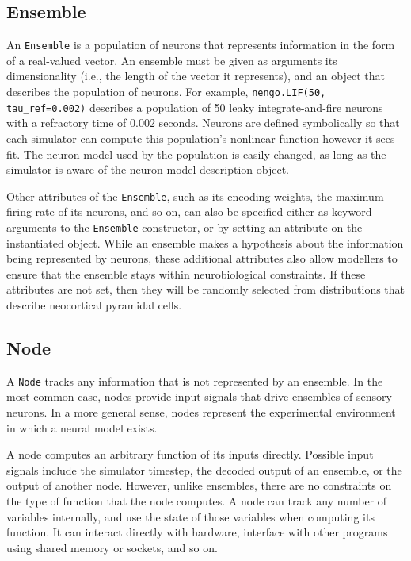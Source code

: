 \documentclass{frontiersSCNS}
\begin{document}
\subsection{Ensemble}

An \texttt{Ensemble} is
a population of neurons
that represents information
in the form of a real-valued vector.
An ensemble must be given as arguments
its dimensionality
(i.e., the length of the vector it represents),
and an object that describes
the population of neurons.
For example, \texttt{nengo.LIF(50, tau\_ref=0.002)}
describes a population
of 50 leaky integrate-and-fire neurons
with a refractory time of 0.002 seconds.
Neurons are defined symbolically
so that each simulator can compute
this population's nonlinear function
however it sees fit.
The neuron model used by the population
is easily changed, as long as the simulator
is aware of the neuron model description object.

Other attributes of the \texttt{Ensemble},
such as its encoding weights,
the maximum firing rate of its neurons,
and so on, can also be specified
either as keyword arguments
to the \texttt{Ensemble} constructor,
or by setting an attribute on the instantiated object.
While an ensemble makes a hypothesis
about the information being represented by neurons,
these additional attributes
also allow modellers to ensure that
the ensemble stays
within neurobiological constraints.
If these attributes are not set,
then they will be randomly selected
from distributions that describe
neocortical pyramidal cells.

\subsection{Node}

A \texttt{Node} tracks any information
that is not represented by an ensemble.
In the most common case,
nodes provide input signals
that drive ensembles of sensory neurons.
In a more general sense,
nodes represent the experimental environment
in which a neural model exists.

A node computes an arbitrary function
of its inputs directly.
Possible input signals include
the simulator timestep,
the decoded output of an ensemble,
or the output of another node.
However, unlike ensembles,
there are no constraints on the type
of function that the node computes.
A node can track any number of variables internally,
and use the state of those variables
when computing its function.
It can interact directly with hardware,
interface with other programs
using shared memory or sockets,
and so on.
\end{document}
